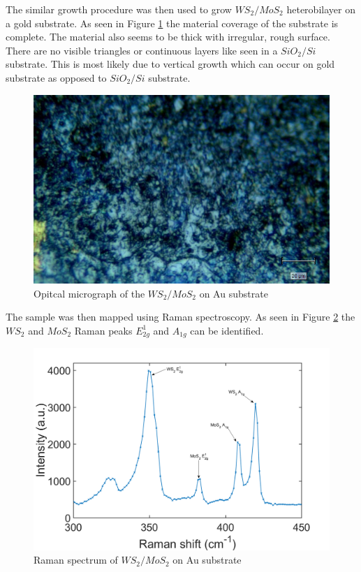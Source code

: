 The similar growth procedure was then used to grow $WS_2/MoS_2$ heterobilayer on a gold substrate. As seen in Figure \ref{fig:HeterostructuresOMAu} the material coverage of the substrate is complete. The material also seems to be thick with irregular, rough surface. There are no visible triangles or continuous layers like seen in a $SiO_2/Si$ substrate. This is most likely due to vertical growth which can occur on gold substrate as opposed to $SiO_2/Si$ substrate.

\begin{figure}[H]
	\begin{center}
		\includegraphics[scale=0.3]{Heterostructures/OMAu.png}
		\caption{Opitcal micrograph of the $WS_2/MoS_2$ on Au substrate}
		\label{fig:HeterostructuresOMAu}
	\end{center}
\end{figure}

The sample was then mapped using Raman spectroscopy. As seen in Figure \ref{fig:HeterostructuresRamanSpectrumAu} the $WS_2$ and $MoS_2$ Raman peaks $E^1_{2g}$ and $A_{1g}$ can be identified.

\begin{figure}[H]
	\begin{center}
		\includegraphics[scale=0.3]{Heterostructures/RamanSpectrumAu.png}
		\caption{Raman spectrum of $WS_2/MoS_2$ on Au substrate}
		\label{fig:HeterostructuresRamanSpectrumAu}
	\end{center}
\end{figure}

